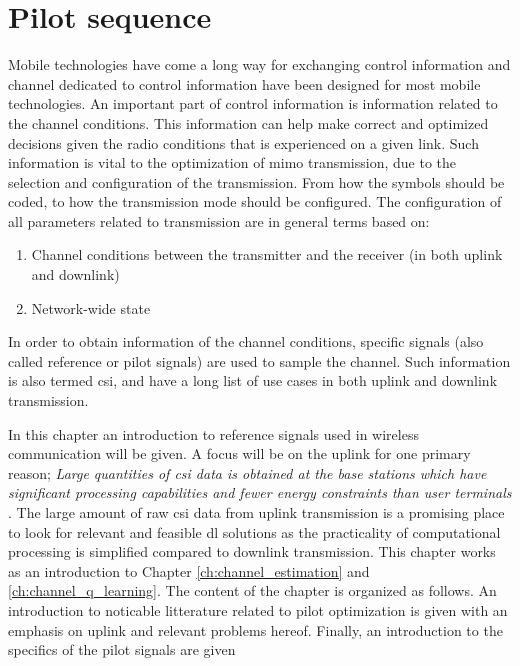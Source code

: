 \chapter{Pilot sequence}\label{ch:pilot_sequence}

Mobile technologies have come a long way for exchanging control information and channel dedicated to control information have been designed for most mobile technologies. An important part of control information is information related to the channel conditions. This information can help make correct and optimized decisions given the radio conditions that is experienced on a given link. Such information is vital to the optimization of \gls{mimo} transmission, due to the selection and configuration of the transmission. From how the symbols should be coded, to how the transmission mode should be configured. The configuration of all parameters related to transmission are in general terms based on:

\begin{enumerate}
    \item Channel conditions between the transmitter and the receiver (in both uplink and downlink)
    \item Network-wide state
\end{enumerate}

In order to obtain information of the channel conditions, specific signals (also called reference or pilot signals) are used to sample the channel. Such information is also termed \gls{csi}, and have a long list of use cases in both uplink and downlink transmission.

In this chapter an introduction to reference signals used in wireless communication will be given. A focus will be on the uplink for one primary reason; \emph{Large quantities of \gls{csi} data is obtained at the base stations which have significant processing capabilities and fewer energy constraints than user terminals \cite{Studer2018}}. The large amount of raw \gls{csi} data from uplink transmission is a promising place to look for relevant and feasible \gls{dl} solutions as the practicality of computational processing is simplified compared to downlink transmission. This chapter works as an introduction to Chapter \ref{ch:channel_estimation} and \ref{ch:channel_q_learning}. The content of the chapter is organized as follows. An introduction to noticable litterature related to pilot optimization is given with an emphasis on uplink and relevant problems hereof. Finally, an introduction to the specifics of the pilot signals are given


